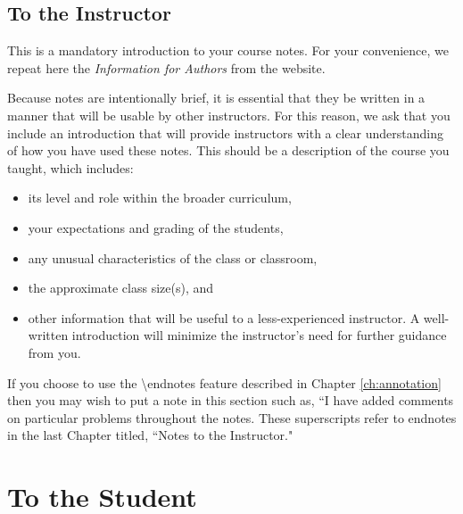 
\begin{annotation}
 \chapter{To the Instructor}

 This is a mandatory introduction to your course notes.  For your convenience, we repeat here
 the \emph{Information for Authors} from the website.

 Because notes are intentionally brief, it is essential that they be written in a manner that will be usable by other
 instructors. For this reason, we ask that you include an introduction that will provide instructors
 with a clear understanding of how you have used these notes. This should be a description of the
 course you taught, which includes:
 \begin{itemize}
  \item  its level and role within the broader curriculum,
  \item  your expectations and grading of the students,
  \item  any unusual characteristics of the class or classroom,
  \item  the approximate class size(s), and
  \item other information that will be useful to a less-experienced instructor.
        A well-written introduction will minimize the instructor's need for further guidance from you.
 \end{itemize}

 If you choose to use the \textbackslash endnotes feature described in Chapter \ref{ch:annotation} then
 you may wish to put a note in this section such as, ``I have added comments on particular problems
 throughout the notes.  These superscripts refer to endnotes in the last Chapter titled,
 ``Notes to the Instructor."

\end{annotation}



\chapter{ To the Student}

